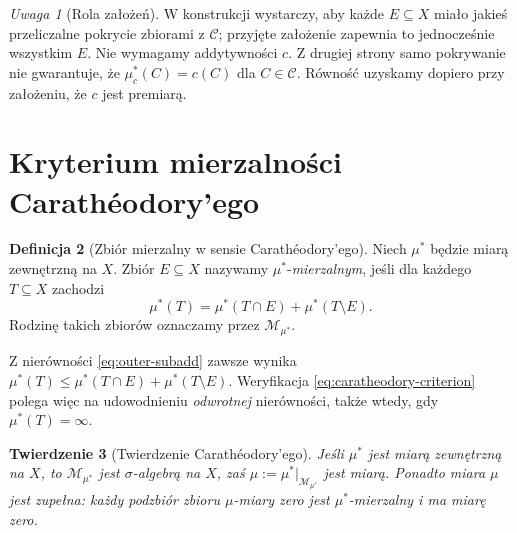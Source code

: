 \documentclass[11pt,a4paper,oneside]{book}
\numberwithin{equation}{chapter}
\theoremstyle{plain}
\newtheorem{twierdzenie}{Twierdzenie}[chapter]
\theoremstyle{definition}
\newtheorem{definicja}[twierdzenie]{Definicja}
\theoremstyle{remark}
\newtheorem{uwaga}[twierdzenie]{Uwaga}
\begin{document}
\begin{uwaga}[Rola założeń]
W konstrukcji wystarczy, aby każde $E\subseteq X$ miało jakieś
przeliczalne pokrycie zbiorami z $\mathcal C$; przyjęte założenie
zapewnia to jednocześnie wszystkim $E$. Nie wymagamy addytywności $c$.
Z drugiej strony samo pokrywanie nie gwarantuje, że
$\mu_c^*(C)=c(C)$ dla $C\in\mathcal C$.
Równość uzyskamy dopiero przy założeniu, że $c$ jest premiarą.
\end{uwaga}

\section{Kryterium mierzalności Carathéodory'ego}

\begin{definicja}[Zbiór mierzalny w sensie Carathéodory'ego]
\label{def:caratheodory-measurable}
Niech $\mu^*$ będzie miarą zewnętrzną na $X$. Zbiór $E\subseteq X$
nazywamy $\mu^*$-\emph{mierzalnym}, jeśli dla każdego $T\subseteq X$
zachodzi
\begin{equation}\label{eq:caratheodory-criterion}
\mu^*(T)=\mu^*(T\cap E)+\mu^*(T\setminus E).
\end{equation}
Rodzinę takich zbiorów oznaczamy przez $\mathcal M_{\mu^*}$.
\end{definicja}

Z nierówności \eqref{eq:outer-subadd} zawsze wynika
$\mu^*(T)\le\mu^*(T\cap E)+\mu^*(T\setminus E)$.
Weryfikacja \eqref{eq:caratheodory-criterion} polega więc na
udowodnieniu \emph{odwrotnej} nierówności, także wtedy, gdy
$\mu^*(T)=\infty$.

\begin{twierdzenie}[Twierdzenie Carathéodory'ego]
\label{thm:caratheodory}
Jeśli $\mu^*$ jest miarą zewnętrzną na $X$, to
$\mathcal M_{\mu^*}$ jest $\sigma$-algebrą na $X$, zaś
$\mu:=\mu^*|_{\mathcal M_{\mu^*}}$ jest miarą. Ponadto miara
$\mu$ jest zupełna: każdy podzbiór zbioru $\mu$-miary zero jest
$\mu^*$-mierzalny i ma miarę zero.
\end{twierdzenie}
\end{document}
